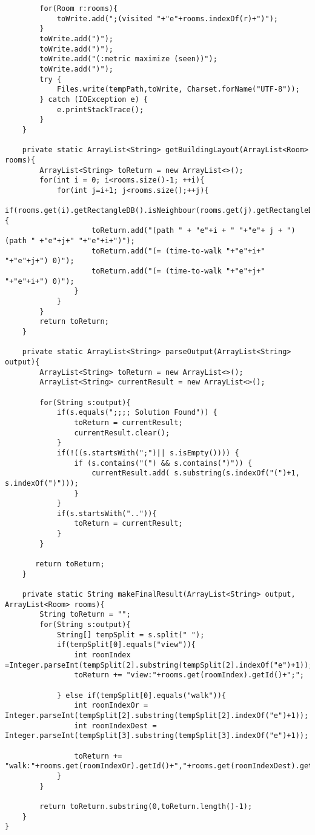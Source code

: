 \begin{lstlisting}
        for(Room r:rooms){
            toWrite.add(";(visited "+"e"+rooms.indexOf(r)+")");
        }
        toWrite.add(")");
        toWrite.add(")");
        toWrite.add("(:metric maximize (seen))");
        toWrite.add(")");
        try {
            Files.write(tempPath,toWrite, Charset.forName("UTF-8"));
        } catch (IOException e) {
            e.printStackTrace();
        }
    }

    private static ArrayList<String> getBuildingLayout(ArrayList<Room> rooms){
        ArrayList<String> toReturn = new ArrayList<>();
        for(int i = 0; i<rooms.size()-1; ++i){
            for(int j=i+1; j<rooms.size();++j){
                if(rooms.get(i).getRectangleDB().isNeighbour(rooms.get(j).getRectangleDB())){
                    toReturn.add("(path " + "e"+i + " "+"e"+ j + ") (path " +"e"+j+" "+"e"+i+")");
                    toReturn.add("(= (time-to-walk "+"e"+i+" "+"e"+j+") 0)");
                    toReturn.add("(= (time-to-walk "+"e"+j+" "+"e"+i+") 0)");
                }
            }
        }
        return toReturn;
    }

    private static ArrayList<String> parseOutput(ArrayList<String> output){
        ArrayList<String> toReturn = new ArrayList<>();
        ArrayList<String> currentResult = new ArrayList<>();

        for(String s:output){
            if(s.equals(";;;; Solution Found")) {
                toReturn = currentResult;
                currentResult.clear();
            }
            if(!((s.startsWith(";")|| s.isEmpty()))) {
                if (s.contains("(") && s.contains(")")) {
                    currentResult.add( s.substring(s.indexOf("(")+1, s.indexOf(")")));
                }
            }
            if(s.startsWith("..")){
                toReturn = currentResult;
            }
        }

       return toReturn;
    }

    private static String makeFinalResult(ArrayList<String> output, ArrayList<Room> rooms){
        String toReturn = "";
        for(String s:output){
            String[] tempSplit = s.split(" ");
            if(tempSplit[0].equals("view")){
                int roomIndex =Integer.parseInt(tempSplit[2].substring(tempSplit[2].indexOf("e")+1));
                toReturn += "view:"+rooms.get(roomIndex).getId()+";";

            } else if(tempSplit[0].equals("walk")){
                int roomIndexOr = Integer.parseInt(tempSplit[2].substring(tempSplit[2].indexOf("e")+1));
                int roomIndexDest = Integer.parseInt(tempSplit[3].substring(tempSplit[3].indexOf("e")+1));

                toReturn += "walk:"+rooms.get(roomIndexOr).getId()+","+rooms.get(roomIndexDest).getId()+";";
            }
        }

        return toReturn.substring(0,toReturn.length()-1);
    }
}
\end{lstlisting}
\newpage
